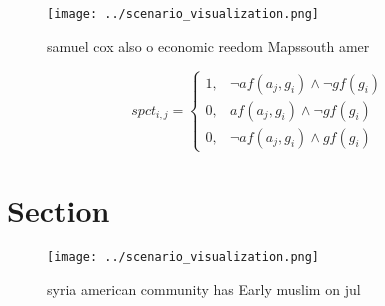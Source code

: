 \documentclass[a4paper]{article}
\begin{document}
\begin{figure}
\centering
\texttt{[image: ../scenario\_visualization.png]}
\caption{ samuel cox also o economic reedom Mapssouth amer
}
\end{figure}
 
\begin{equation}
spct_{i,j} =
\begin{cases}
1, & \text{$\neg af(a_j,g_i) \wedge \neg gf(g_i)$}\\
0, & \text{$af(a_j,g_i) \wedge \neg gf(g_i)$}\\
0, & \text{$\neg af(a_j,g_i) \wedge gf(g_i)$}
\end{cases}
\end{equation}

\section{Section}

\begin{figure}
\centering
\texttt{[image: ../scenario\_visualization.png]}
\caption{ syria american community has Early muslim on jul
}
\end{figure}
 
\end{document}
